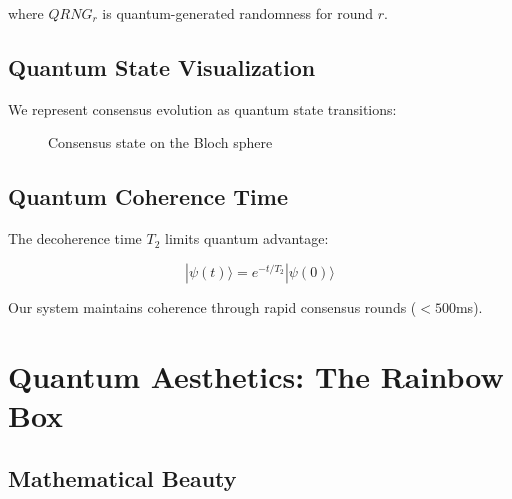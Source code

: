 \documentclass[11pt,a4paper]{article}
\begin{document}
where $QRNG_r$ is quantum-generated randomness for round $r$.

\subsection{Quantum State Visualization}

We represent consensus evolution as quantum state transitions:

\begin{figure}[H]
\centering
{}
\caption{Consensus state on the Bloch sphere}
\end{figure}

\subsection{Quantum Coherence Time}

The decoherence time $T_2$ limits quantum advantage:

\begin{equation}
|\psi(t)\rangle = e^{-t/T_2}|\psi(0)\rangle
\end{equation}

Our system maintains coherence through rapid consensus rounds ($<500$ms).

\section{Quantum Aesthetics: The Rainbow Box}

\subsection{Mathematical Beauty}
\end{document}
